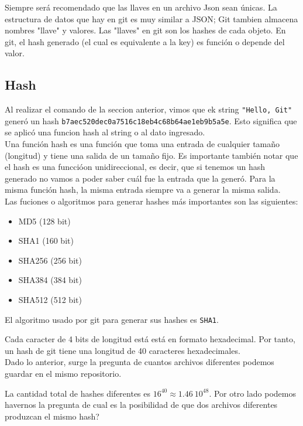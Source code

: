 Siempre será recomendado que las llaves en un archivo Json sean únicas. La estructura de datos que hay en git es muy similar a JSON; Git tambien almacena nombres "llave" y valores. Las "llaves" en git son los hashes de cada objeto. En git, el hash generado (el cual es equivalente a la key) es función o depende del valor.

\subsection{Hash}

 Al realizar el comando de la seccion anterior, vimos que ek string \texttt{"Hello, Git"} generó un hash \texttt{b7aec520dec0a7516c18eb4c68b64ae1eb9b5a5e}. Esto significa que se aplicó una funcion hash al string o al dato ingresado. \\

 Una función hash es una función que toma una entrada de cualquier tamaño (longitud) y tiene una salida de un tamaño fijo. Es importante también notar que el hash es una funccióon unidireccional, es decir, que si tenemos un hash generado no vamos a poder saber cuál fue la entrada que la generó. Para la misma función hash, la misma entrada siempre va a generar la misma salida. \\

 Las fuciones o algoritmos para generar hashes más importantes son las siguientes:

 \begin{itemize}
     \item MD5 (128 bit)
     \item SHA1 (160 bit)
     \item SHA256 (256 bit)
     \item SHA384 (384 bit)
     \item SHA512 (512 bit)
 \end{itemize}

 El algoritmo usado por git para generar sus hashes es \texttt{SHA1}.

 Cada caracter de 4 bits de longitud está está en formato hexadecimal. Por tanto, un hash de git tiene una longitud de 40 caracteres hexadecimales. \\

 Dado lo anterior, surge la pregunta de cuantos archivos diferentes podemos guardar en el mismo repositorio.

 La cantidad total de hashes diferentes es $16^{40} \approx 1.46 \ 10^{48}$. Por otro lado podemos havernos la pregunta de cual es la posibilidad de que dos archivos diferentes produzcan el mismo hash? \\

